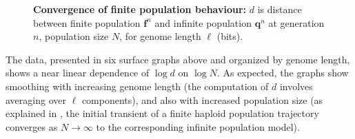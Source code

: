 \begin{figure}[H]
\begin{center}
\hspace{5pt}
\caption{\textbf{Convergence of finite population behaviour:} $d$ is
  distance between finite population ${\bm f}^n$ and infinite
  population ${\bm q}^n$ at generation $n$, population size $N$, for
  genome length $\ell$ (bits).}
\label{convergence}
\end{center}
\end{figure}

The data, presented in six surface graphs above and organized by
genome length, shows a near linear dependence of $\log d$ on $\log N$.
As expected, the graphs show smoothing with increasing genome length
(the computation of $d$ involves averaging over $\ell$ components),
and also with increased population size (as explained in
\cite{Vose1999}, the initial transient of a finite haploid population
trajectory converges as $N \rightarrow \infty$ to the corresponding
infinite population model).

